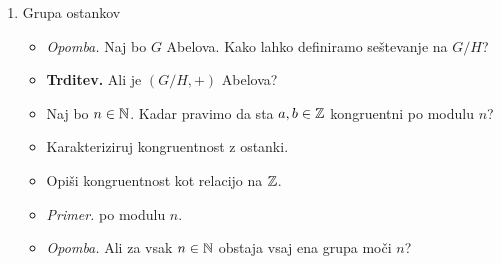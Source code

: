 \begin{enumerate}
    \item Grupa ostankov
    \begin{itemize}
        \item \colorbox{yellow!30}{\emph{Opomba.}} Naj bo $G$ Abelova. Kako lahko definiramo seštevanje na $G/H$?
        \item \colorbox{blue!30}{\textbf{Trditev.}} Ali je $(G/H, +)$ Abelova?        
        \item Naj bo $n \in \mathbb{N}$. Kadar pravimo da sta $a, b \in \mathbb{Z}$ kongruentni po modulu $n$?
        \item Karakteriziruj kongruentnost z ostanki.
        \item Opiši kongruentnost kot relacijo na $\mathbb{Z}$.
        \item \colorbox{yellow!30}{\emph{Primer.}}  po modulu $n$.
        \item \colorbox{yellow!30}{\emph{Opomba.}} Ali za vsak $n \in \mathbb{N}$ obstaja vsaj ena grupa moči $n$?
    \end{itemize}


\end{enumerate}
